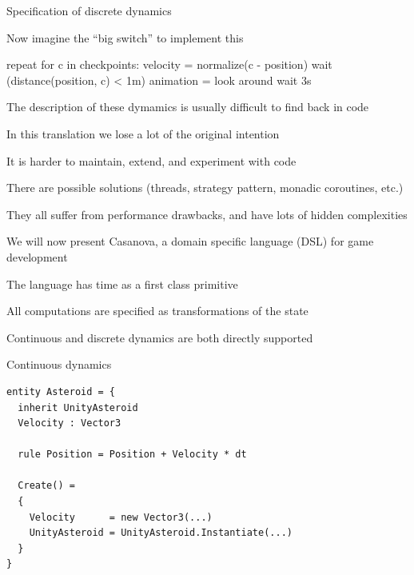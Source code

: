 \documentclass{beamer}
\begin{document}
\begin{frame}[fragile]{Specification of discrete dynamics}
\begin{codewithblock}{\pause \item Now imagine the ``big switch'' to implement this}
repeat
  for c in checkpoints:
    velocity = normalize(c - position)
    wait (distance(position, c) < 1m)
    animation = look around
    wait 3s
\end{codewithblock}
\end{frame}

\begin{slide}{
\item The description of these dymamics is usually difficult to find back in code
\item In this translation we lose a lot of the original intention
\item It is harder to maintain, extend, and experiment with code
}\end{slide}

\begin{slide}{
\item There are possible solutions (threads, strategy pattern, monadic coroutines, etc.)
\item They all suffer from performance drawbacks, and have lots of hidden complexities
}\end{slide}

\begin{slide}{
\item We will now present Casanova, a domain specific language (DSL) for game development
\item The language has time as a first class primitive
\item All computations are specified as transformations of the state
\item Continuous and discrete dynamics are both directly supported
}\end{slide}

\begin{frame}[fragile]{Continuous dynamics}
\begin{lstlisting}
entity Asteroid = {
  inherit UnityAsteroid
  Velocity : Vector3
  
  rule Position = Position + Velocity * dt

  Create() =
  {
    Velocity      = new Vector3(...)
    UnityAsteroid = UnityAsteroid.Instantiate(...)
  }
}
\end{lstlisting}
\end{frame}
\end{document}
